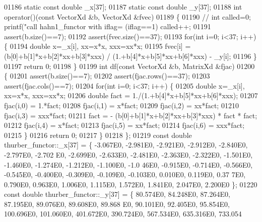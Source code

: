 \begin{DoxyCode}
01186     \textcolor{keyword}{static} \textcolor{keyword}{const} \textcolor{keywordtype}{double} \_x[37];
01187     \textcolor{keyword}{static} \textcolor{keyword}{const} \textcolor{keywordtype}{double} \_y[37];
01188     \textcolor{keywordtype}{int} operator()(\textcolor{keyword}{const} VectorXd &b, VectorXd &fvec)
01189     \{
01190         \textcolor{comment}{//        int called=0; printf("call hahn1\_functor with  iflag=%
       (iflag==1) called++;}
01191         assert(b.size()==7);
01192         assert(fvec.size()==37);
01193         \textcolor{keywordflow}{for}(\textcolor{keywordtype}{int} i=0; i<37; i++) \{
01194             \textcolor{keywordtype}{double} x=\_x[i], xx=x*x, xxx=xx*x;
01195             fvec[i] = (b[0]+b[1]*x+b[2]*xx+b[3]*xxx) / (1.+b[4]*x+b[5]*xx+b[6]*xxx) - \_y[i];
01196         \}
01197         \textcolor{keywordflow}{return} 0;
01198     \}
01199     \textcolor{keywordtype}{int} df(\textcolor{keyword}{const} VectorXd &b, MatrixXd &fjac)
01200     \{
01201         assert(b.size()==7);
01202         assert(fjac.rows()==37);
01203         assert(fjac.cols()==7);
01204         \textcolor{keywordflow}{for}(\textcolor{keywordtype}{int} i=0; i<37; i++) \{
01205             \textcolor{keywordtype}{double} x=\_x[i], xx=x*x, xxx=xx*x;
01206             \textcolor{keywordtype}{double} fact = 1./(1.+b[4]*x+b[5]*xx+b[6]*xxx);
01207             fjac(i,0) = 1.*fact;
01208             fjac(i,1) = x*fact;
01209             fjac(i,2) = xx*fact;
01210             fjac(i,3) = xxx*fact;
01211             fact = - (b[0]+b[1]*x+b[2]*xx+b[3]*xxx) * fact * fact;
01212             fjac(i,4) = x*fact;
01213             fjac(i,5) = xx*fact;
01214             fjac(i,6) = xxx*fact;
01215         \}
01216         \textcolor{keywordflow}{return} 0;
01217     \}
01218 \};
01219 \textcolor{keyword}{const} \textcolor{keywordtype}{double} thurber\_functor::\_x[37] = \{ -3.067E0, -2.981E0, -2.921E0, -2.912E0, -2.840E0, -2.797E0, -2.702
      E0, -2.699E0, -2.633E0, -2.481E0, -2.363E0, -2.322E0, -1.501E0, -1.460E0, -1.274E0, -1.212E0, -1.100E0, -1.0
      46E0, -0.915E0, -0.714E0, -0.566E0, -0.545E0, -0.400E0, -0.309E0, -0.109E0, -0.103E0, 0.010E0, 0.119E0, 0.37
      7E0, 0.790E0, 0.963E0, 1.006E0, 1.115E0, 1.572E0, 1.841E0, 2.047E0, 2.200E0 \};
01220 \textcolor{keyword}{const} \textcolor{keywordtype}{double} thurber\_functor::\_y[37] = \{ 80.574E0, 84.248E0, 87.264E0, 87.195E0, 89.076E0, 89.608E0, 89.868
      E0, 90.101E0, 92.405E0, 95.854E0, 100.696E0, 101.060E0, 401.672E0, 390.724E0, 567.534E0, 635.316E0, 733.054

\end{DoxyCode}
